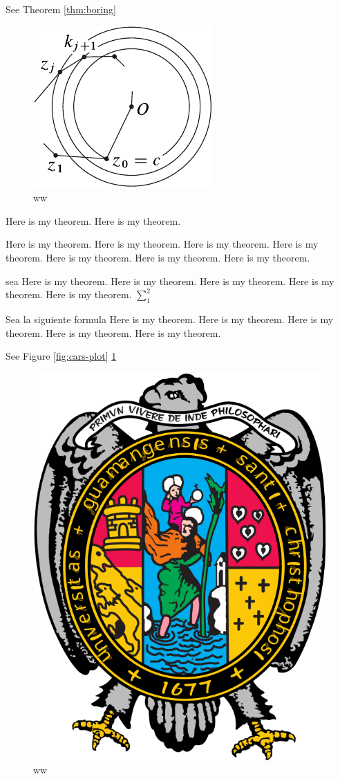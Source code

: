 \documentclass[12pt,]{krantz}
\theoremstyle{definition}
\theoremstyle{definition}
\theoremstyle{definition}
\theoremstyle{remark}
\let\BeginKnitrBlock\begin \let\EndKnitrBlock\end
\begin{document}
See Theorem \ref{thm:boring}

\begin{figure}

{\centering \includegraphics{inverse} 

}

\caption{ww}\label{fig:pressure2}
\end{figure}

Here is my theorem.
Here is my theorem.

\BeginKnitrBlock{theorem}
\protect\hypertarget{thm:boring}{}{\label{thm:boring} }Here is my theorem. Here is my theorem.
Here is my theorem.
Here is my theorem.
Here is my theorem.
Here is my theorem.
Here is my theorem.
\EndKnitrBlock{theorem}

sea Here is my theorem.
Here is my theorem.
Here is my theorem.
Here is my theorem.
Here is my theorem. \(\sum_1^2\)

\BeginKnitrBlock{definition}[ww]
\protect\hypertarget{def:unnamed-chunk-1}{}{\label{def:unnamed-chunk-1} {} }Sea la siguiente formula Here is my theorem.
Here is my theorem.
Here is my theorem.
Here is my theorem.
Here is my theorem.
\EndKnitrBlock{definition}

See Figure \ref{fig:cars-plot} \ref{fig:pressure2}

\begin{figure}

{\centering \includegraphics[width=0.2\linewidth]{U} 

}

\caption{ww}\label{fig:pressure1}
\end{figure}
\end{document}
